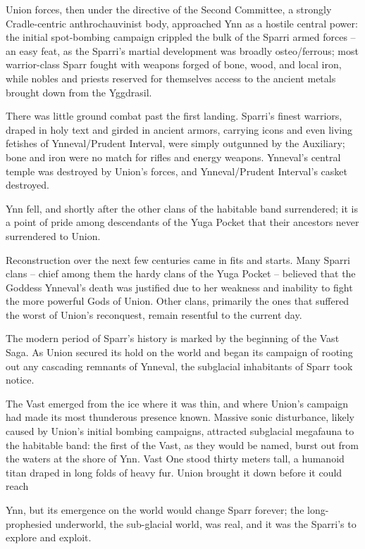 Union forces, then under the directive of the Second Committee, a strongly Cradle-centric
anthrochauvinist body, approached Ynn as a hostile central power: the initial spot-bombing
campaign crippled the bulk of the Sparri armed forces -- an easy feat, as the Sparri’s martial
development was broadly osteo/ferrous; most warrior-class Sparr fought with weapons forged of
bone, wood, and local iron, while nobles and priests reserved for themselves access to the
ancient metals brought down from the Yggdrasil.

There was little ground combat past the first landing. Sparri’s finest warriors, draped in holy text
and girded in ancient armors, carrying icons and even living fetishes of Ynneval/Prudent Interval,
were simply outgunned by the Auxiliary; bone and iron were no match for rifles and energy
weapons. Ynneval’s central temple was destroyed by Union’s forces, and Ynneval/Prudent
Interval’s casket destroyed.

Ynn fell, and shortly after the other clans of the habitable band surrendered; it is a point of pride
among descendants of the Yuga Pocket that their ancestors never surrendered to Union.

Reconstruction over the next few centuries came in fits and starts. Many Sparri clans -- chief
among them the hardy clans of the Yuga Pocket -- believed that the Goddess Ynneval’s death
was justified due to her weakness and inability to fight the more powerful Gods of Union. Other
clans, primarily the ones that suffered the worst of Union’s reconquest, remain resentful to the
current day.

The modern period of Sparr’s history is marked by the beginning of the Vast Saga. As Union
secured its hold on the world and began its campaign of rooting out any cascading remnants of
Ynneval, the subglacial inhabitants of Sparr took notice.

The Vast emerged from the ice where it was thin, and where Union’s campaign had made its most
thunderous presence known. Massive sonic disturbance, likely caused by Union’s initial bombing
campaigns, attracted subglacial megafauna to the habitable band: the first of the Vast, as they
would be named, burst out from the waters at the shore of Ynn. Vast One stood thirty meters tall,
a humanoid titan draped in long folds of heavy fur. Union brought it down before it could reach




Ynn, but its emergence on the world would change Sparr forever; the long-prophesied
underworld, the sub-glacial world, was real, and it was the Sparri’s to explore and exploit.

